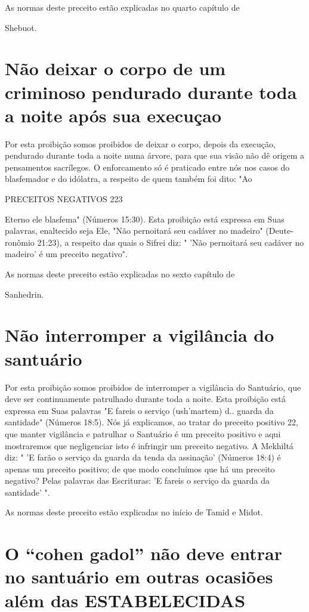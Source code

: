 As normas deste preceito estão explicadas no quarto capítulo de


Shebuot.

\section{Não deixar o corpo de um criminoso pendurado durante 
toda a noite após sua execuçao}

Por esta proibição somos proibidos de deixar o corpo, depois da
exe­cução, pendurado durante toda a noite numa árvore, para que sua
visão não dê origem a pensamentos sacrílegos. O enforcamento só é
praticado entre nós nos casos do blasfemador e do idólatra, a respeito
de quem também foi dito: "Ao

PRECEITOS NEGATIVOS 223

Eterno ele blasfema" (Números 15:30). Esta proibição está expressa em
Suas palavras, enaltecido seja Ele, "Não pernoitará seu cadáver no
madeiro" (Deute­ronômio 21:23), a respeito das quais o Sifrei diz: "
'Não pernoitará seu cadáver no madeiro' é um preceito negativo".


As normas deste preceito estão explicadas no sexto capítulo de


Sanhedrin.

\section{Não interromper a vigilância do santuário}

Por esta proibição somos proibidos de interromper a vigilância do
Santuário, que deve ser continuamente patrulhado durante toda a noite.
Esta proibição está expressa em Suas palavras "E fareis o serviço
(ush'martem) d.. guarda da santidade" (Números 18:5). Nós já explicamos,
ao tratar do preceito positivo 22, que manter vigilância e patrulhar o
Santuário é um preceito positi­vo e aqui mostraremos que negligenciar
isto é infringir um preceito negativo. A Mekhiltá diz: " 'E farão o
serviço da guarda da tenda da assinação' (Números 18:4) é apenas um
preceito positivo; de que modo concluímos que há um pre­ceito negativo?
Pelas palavras das Escrituras: 'E fareis o serviço da guarda da
santidade' ".


As normas deste preceito estão explicadas no início de Tamid e Midot.


\section{O ``cohen gadol'' não deve entrar no santuário 
em outras ocasiões além das ESTABELECIDAS}

